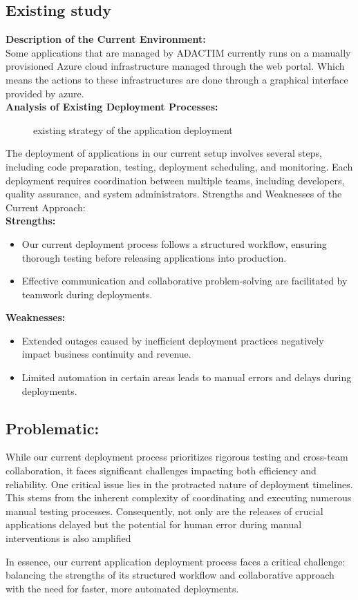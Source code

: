 \subsection{Existing study}
\noindent
\textbf{Description of the Current Environment:}
\\
Some applications that are managed by ADACTIM currently runs on a manually provisioned Azure cloud infrastructure managed through the web portal. Which means the actions to these infrastructures are done through a graphical interface provided by azure.
\\
\textbf{Analysis of Existing Deployment Processes:}

\begin{figure}[htpb]
    \centering
    \caption{existing strategy of the application deployment}
    \label{fig:existing_strategy}
\end{figure}

The deployment of applications in our current setup involves several steps, including code preparation, testing, deployment scheduling, and monitoring. Each deployment requires coordination between multiple teams, including developers, quality assurance, and system administrators.
Strengths and Weaknesses of the Current Approach:
\\
\textbf{Strengths:}
\begin{itemize}
    \item Our current deployment process follows a structured workflow, ensuring thorough testing before releasing applications into production.
    \item Effective communication and collaborative problem-solving are facilitated by teamwork during deployments.
\end{itemize}
\textbf{Weaknesses:}
\begin{itemize}
    \item Extended outages caused by inefficient deployment practices negatively impact business continuity and revenue.
    \item Limited automation in certain areas leads to manual errors and delays during deployments.
\end{itemize}
\noindent
\subsection{Problematic:}
\par
While our current deployment process prioritizes rigorous testing and cross-team collaboration, it faces significant challenges impacting both efficiency and reliability. One critical issue lies in the protracted nature of deployment timelines. This stems from the inherent complexity of coordinating and executing numerous manual testing processes. Consequently, not only are the releases of crucial applications delayed but the potential for human error during manual interventions is also amplified
\par
In essence, our current application deployment process faces a critical challenge: balancing the strengths of its structured workflow and collaborative approach with the need for faster, more automated deployments.

